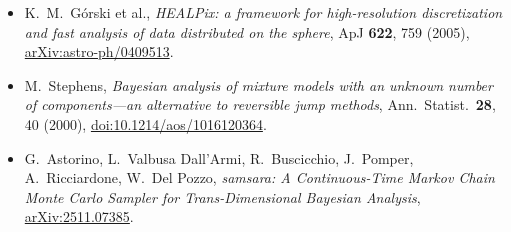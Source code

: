 \documentclass[11pt,a4paper]{article}
\begin{document}
\begin{itemize}
        \href{https://doi.org/10.1214/08-AOS601}{doi:10.1214/08-AOS601}.
  \item K.~M.~G\'orski et al., \emph{HEALPix: a framework for high-resolution
        discretization and fast analysis of data distributed on the sphere}, ApJ
        \textbf{622}, 759 (2005),
        \href{https://arxiv.org/abs/astro-ph/0409513}{arXiv:astro-ph/0409513}.
  \item M.~Stephens, \emph{Bayesian analysis of mixture models with an unknown number of
        components---an alternative to reversible jump methods}, Ann.\ Statist.\
        \textbf{28}, 40 (2000),
        \href{https://doi.org/10.1214/aos/1016120364}{doi:10.1214/aos/1016120364}.
  \item G.~Astorino, L.~Valbusa Dall'Armi, R.~Buscicchio, J.~Pomper, A.~Ricciardone,
        W.~Del Pozzo, \emph{samsara: A Continuous-Time Markov Chain Monte Carlo Sampler
        for Trans-Dimensional Bayesian Analysis},
        \href{https://arxiv.org/abs/2511.07385}{arXiv:2511.07385}.
\end{itemize}
\end{document}
